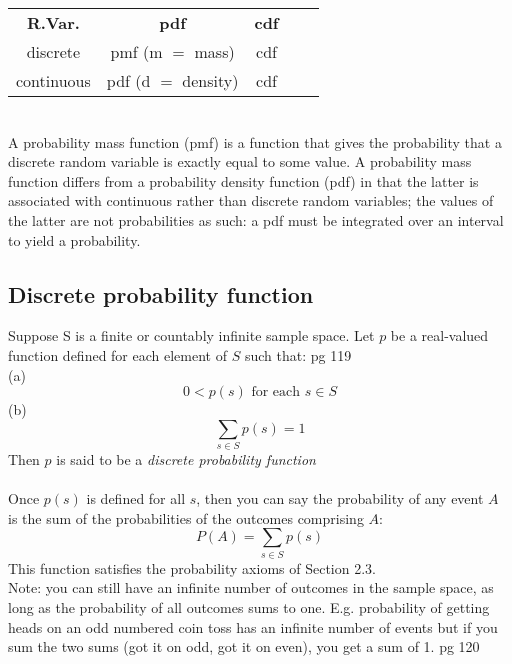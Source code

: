 \begin{center}
\begin{tabular}{ c c c c c }
 \textbf{R.Var.} & \textbf{pdf} & \textbf{cdf} &   \\ 
 	discrete &   pmf (m $=$ mass) & cdf \\
	continuous & pdf (d $=$ density) & cdf
 \end{tabular}
\end{center}
\hfill \\
A probability mass function (pmf) is a function that gives the probability that a discrete random variable is exactly equal to some value.
A probability mass function differs from a probability density function (pdf) in that the latter is associated with continuous rather than discrete random variables; the values of the latter are not probabilities as such: a pdf must be integrated over an interval to yield a probability.


\subsection{Discrete probability function}
Suppose S is a finite or countably infinite sample space.  Let $p$ be a real-valued function defined for each element of $S$ such that: {\tiny pg 119} \hfill \\
(a)  \[ 0 < p(s) \mbox{ for each \ } s \in S  \] 
(b)  \[  \sum\limits_{s \in S} p(s) = 1 \]
Then $p$ is said to be a \textit{discrete probability function} \hfill \\
\hfill \\
Once $p(s)$ is defined for all $s$, then you can say the probability of any event $A$ is the sum of the probabilities of the outcomes comprising $A$: 
\[  P(A) = \sum\limits_{s \in S} p(s) \]
This function satisfies the probability axioms of Section 2.3.   \hfill \\

Note: you can still have an infinite number of outcomes in the sample space, as long as the probability of all outcomes sums to one.  E.g. probability of getting heads on an odd numbered coin toss has an infinite number of events but if you sum the two sums (got it on odd, got it on even), you get a sum of 1.  {\tiny pg 120}

